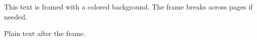 \documentclass{article}
\begin{document}
\begin{mdframed}[backgroundcolor=yellow!20,linewidth=2pt]
This text is framed with a colored background.
The frame breaks across pages if needed.
\end{mdframed}
Plain text after the frame.
\end{document}
